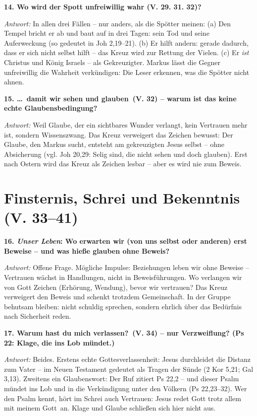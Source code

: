 \documentclass[12pt,a4paper]{article}
\newcommand{\frage}[1]{\par\vspace{0.7em}\noindent\textbf{#1}\par}
\newcommand{\antwort}[1]{\par\noindent\textit{Antwort:} #1\par}
\begin{document}
\frage{14. Wo wird der Spott unfreiwillig wahr (V. 29. 31. 32)?}
\antwort{In allen drei Fällen -- nur anders, als die Spötter meinen: (a) Den Tempel \glqq bricht er ab und baut auf in drei Tagen\grqq{}: sein Tod und seine Auferweckung (so gedeutet in Joh 2,19--21). (b) Er \glqq hilft andern\grqq{}: gerade dadurch, dass er sich nicht selbst hilft -- das Kreuz wird zur Rettung der Vielen. (c) Er \emph{ist} Christus und König Israels -- als Gekreuzigter. Markus lässt die Gegner unfreiwillig die Wahrheit verkündigen: Die Leser erkennen, was die Spötter nicht ahnen.}

\frage{15. \glqq \ldots\ damit wir sehen und glauben\grqq\ (V. 32) -- warum ist das keine echte Glaubensbedingung?}
\antwort{Weil Glaube, der ein sichtbares Wunder verlangt, kein Vertrauen mehr ist, sondern Wissenszwang. Das Kreuz verweigert das Zeichen bewusst: Der Glaube, den Markus sucht, entsteht am gekreuzigten Jesus selbst -- ohne Absicherung (vgl. Joh 20,29: \glqq Selig sind, die nicht sehen und doch glauben\grqq{}). Erst nach Ostern wird das Kreuz als Zeichen lesbar -- aber es wird nie zum Beweis.}

\section*{Finsternis, Schrei und Bekenntnis (V. 33--41)}

\frage{16. \emph{Unser Leben}: Wo erwarten wir (von uns selbst oder anderen) erst Beweise -- und was hieße glauben ohne Beweis?}
\antwort{Offene Frage. Mögliche Impulse: Beziehungen leben wir ohne Beweise -- Vertrauen wächst in Handlungen, nicht in Beweisführungen. Wo verlangen wir von Gott Zeichen (Erhörung, Wendung), bevor wir vertrauen? Das Kreuz verweigert den Beweis und schenkt trotzdem Gemeinschaft. In der Gruppe behutsam bleiben: nicht schuldig sprechen, sondern ehrlich über das Bedürfnis nach Sicherheit reden.}

\frage{17. \glqq Warum hast du mich verlassen?\grqq\ (V. 34) -- nur Verzweiflung? (Ps 22: Klage, die ins Lob mündet.)}
\antwort{Beides. Erstens echte Gottesverlassenheit: Jesus durchleidet die Distanz zum Vater -- im Neuen Testament gedeutet als Tragen der Sünde (2 Kor 5,21; Gal 3,13). Zweitens ein Glaubenswort: Der Ruf zitiert Ps 22,2 -- und dieser Psalm mündet ins Lob und in die Verkündigung unter den Völkern (Ps 22,23--32). Wer den Psalm kennt, hört im Schrei auch Vertrauen: Jesus redet Gott trotz allem mit \glqq meinem Gott\grqq\ an. Klage und Glaube schließen sich hier nicht aus.}
\end{document}
